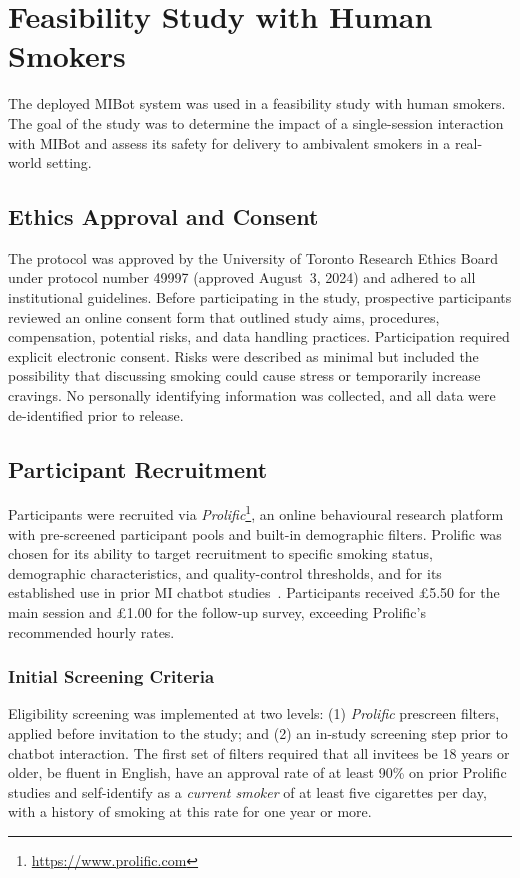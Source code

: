 \section{Feasibility Study with Human Smokers}
\label{sec:feasibility}
The deployed MIBot system was used in a feasibility study with human smokers. The goal of the study was to determine the impact of a single-session interaction with MIBot and assess its safety for delivery to ambivalent smokers in a real-world setting.

\subsection{Ethics Approval and Consent}
The protocol was approved by the University of Toronto Research Ethics Board under protocol number 49997 (approved August~3, 2024) and adhered to all institutional guidelines. Before participating in the study, prospective participants reviewed an online consent form that outlined study aims, procedures, compensation, potential risks, and data handling practices. Participation required explicit electronic consent. Risks were described as minimal but included the possibility that discussing smoking could cause stress or temporarily increase cravings. No personally identifying information was collected, and all data were de-identified prior to release.

\subsection{Participant Recruitment}
\label{sec:recruitment}
Participants were recruited via \textit{Prolific}\footnote{\url{https://www.prolific.com}}, an online behavioural research platform with pre-screened participant pools and built-in demographic filters. Prolific was chosen for its ability to target recruitment to specific smoking status, demographic characteristics, and quality-control thresholds, and for its established use in prior MI chatbot studies~\citep{brown2023motivational,almusharraf2020engaging}. Participants received \pounds5.50 for the main session and \pounds1.00 for the follow-up survey, exceeding Prolific's recommended hourly rates.


\subsubsection{Initial Screening Criteria}
Eligibility screening was implemented at two levels: (1) \textit{Prolific} prescreen filters, applied before invitation to the study; and (2) an in-study screening step prior to chatbot interaction. The first set of filters required that all invitees be 18 years or older, be fluent in English, have an approval rate of at least 90\% on prior Prolific studies and self-identify as a \emph{current smoker} of at least five cigarettes per day, with a history of smoking at this rate for one year or more.

